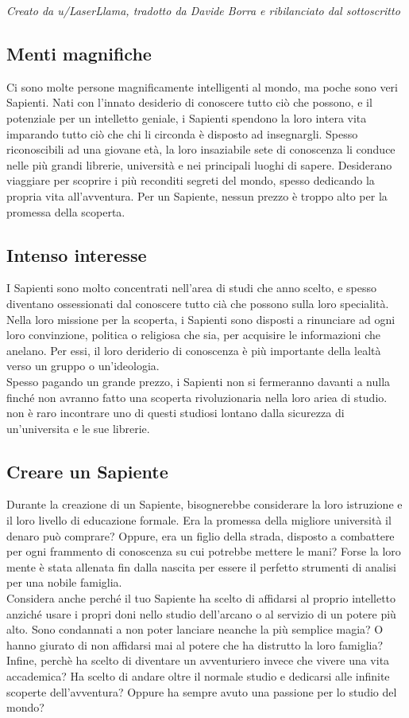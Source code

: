 \textit{Creato da u/LaserLlama, tradotto da Davide Borra e ribilanciato dal sottoscritto}

\subsection{Menti magnifiche}
Ci sono molte persone magnificamente intelligenti al mondo, ma poche sono veri Sapienti. Nati con l'innato desiderio di conoscere tutto ciò che possono, e il potenziale per un intelletto geniale, i Sapienti spendono la loro intera vita imparando tutto ciò che chi li circonda è disposto ad insegnargli. Spesso riconoscibili ad una giovane età, la loro insaziabile sete di conoscenza li conduce nelle più grandi librerie, università e nei principali luoghi di sapere. Desiderano viaggiare per scoprire i più reconditi segreti del mondo, spesso dedicando la propria vita all'avventura. Per un Sapiente, nessun prezzo è troppo alto per la promessa della scoperta.

\subsection{Intenso interesse}
I Sapienti sono molto concentrati nell'area di studi che anno scelto, e spesso diventano ossessionati dal conoscere tutto cià che possono sulla loro specialità. Nella loro missione per la scoperta, i Sapienti sono disposti a rinunciare ad ogni loro convinzione, politica o religiosa che sia, per acquisire le informazioni che anelano. Per essi, il loro deriderio di conoscenza è più importante della lealtà verso un gruppo o un'ideologia. \\
Spesso pagando un grande prezzo, i Sapienti non si fermeranno davanti a nulla finché non avranno fatto una scoperta rivoluzionaria nella loro ariea di studio. non è raro incontrare uno di questi studiosi lontano dalla sicurezza di un'universita e le sue librerie.

\subsection{Creare un Sapiente}
Durante la creazione di un Sapiente, bisognerebbe considerare la loro istruzione e il loro livello di educazione formale. Era la promessa della migliore università il denaro può comprare? Oppure, era un figlio della strada, disposto a combattere per ogni frammento di conoscenza su cui potrebbe mettere le mani? Forse la loro mente è stata allenata fin dalla nascita per essere il perfetto strumenti di analisi per una nobile famiglia.\\
Considera anche perché il tuo Sapiente ha scelto di affidarsi al proprio intelletto anziché usare i propri doni nello studio dell'arcano o al servizio di un potere più alto. Sono condannati a non poter lanciare neanche la più semplice magia? O hanno giurato di non affidarsi mai al potere che ha distrutto la loro famiglia?\\
Infine, perchè ha scelto di diventare un avventuriero invece che vivere una vita accademica? Ha scelto di andare oltre il normale studio e dedicarsi alle infinite scoperte dell'avventura? Oppure ha sempre avuto una passione per lo studio del mondo?

